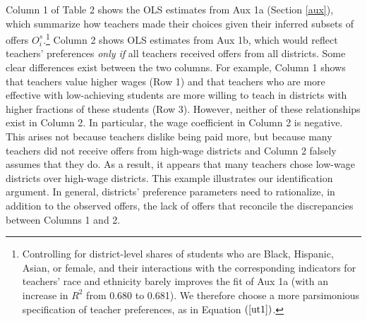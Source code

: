 \documentclass[notitlepage,12pt]{article}%
\begin{document}
Column 1 of Table 2 shows the OLS estimates from Aux 1a (Section \ref{aux}),
which summarize how teachers made their choices given their inferred subsets
of offers $O_{i}^{s}$.\footnote{Controlling for district-level shares of
students who are Black, Hispanic, Asian, or female, and their interactions
with the corresponding indicators for teachers' race and ethnicity barely
improves the fit of Aux 1a (with an increase in $R^{2}$ from 0.680 to 0.681).
We therefore choose a more parsimonious specification of teacher preferences,
as in Equation $\left(  \ref{ut1}\right)  $.} Column 2 shows OLS estimates
from Aux 1b, which would reflect teachers' preferences \emph{only if} all
teachers received offers from all districts. Some clear differences exist
between the two columns. For example, Column 1 shows that teachers value
higher wages (Row 1) and that teachers who are more effective with
low-achieving students are more willing to teach in districts with higher
fractions of these students (Row 3). However, neither of these relationships
exist in Column 2. In particular, the wage coefficient in Column 2 is
negative. This arises not because teachers dislike being paid more, but
because many teachers did not receive offers from high-wage districts and
Column 2 falsely assumes that they do. As a result, it appears that many
teachers chose low-wage districts over high-wage districts. This example
illustrates our identification argument. In general, districts' preference
parameters need to rationalize, in addition to the observed offers, the lack
of offers that reconcile the discrepancies between Columns 1 and 2.
\end{document}

